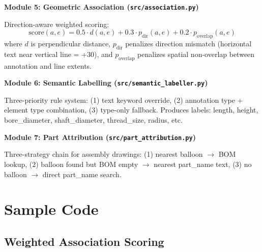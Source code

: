 \documentclass[12pt,a4paper]{article}
\begin{document}
\textbf{Module 5: Geometric Association (\texttt{src/association.py})}

Direction-aware weighted scoring:
\begin{equation}
\text{score}(a, e) = 0.5 \cdot d(a, e) + 0.3 \cdot p_{\text{dir}}(a, e) + 0.2 \cdot p_{\text{overlap}}(a, e)
\end{equation}
where $d$ is perpendicular distance, $p_{\text{dir}}$ penalizes direction mismatch (horizontal text near vertical line = +30), and $p_{\text{overlap}}$ penalizes spatial non-overlap between annotation and line extents.

\textbf{Module 6: Semantic Labelling (\texttt{src/semantic\_labeller.py})}

Three-priority rule system: (1) text keyword override, (2) annotation type + element type combination, (3) type-only fallback. Produces labels: length, height, bore\_diameter, shaft\_diameter, thread\_size, radius, etc.

\textbf{Module 7: Part Attribution (\texttt{src/part\_attribution.py})}

Three-strategy chain for assembly drawings: (1) nearest balloon $\rightarrow$ BOM lookup, (2) balloon found but BOM empty $\rightarrow$ nearest part\_name text, (3) no balloon $\rightarrow$ direct part\_name search.

\section{Sample Code}

\subsection{Weighted Association Scoring}
\end{document}

